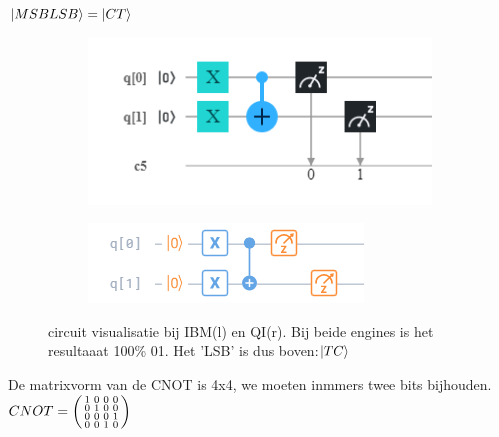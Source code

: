 \documentclass[../main.tex]{subfiles}
\begin{document}
$\ket{MSB LSB}=\ket{CT}$
\begin{figure}[h!]
\begin{subfigure}{.5\textwidth}
\leavevmode
\begin{center}
\includegraphics[width=.9\textwidth]{./img/IBMregisters.png}
\end{center}
\end{subfigure}%
\begin{subfigure}{.5\textwidth}
\leavevmode
\begin{center}
\includegraphics[width=.9\textwidth]{./img/QIregisters.png}
\end{center}
\end{subfigure}
\caption{circuit visualisatie bij IBM(l) en QI(r). Bij beide engines is het resultaaat 100\% 01.  Het 'LSB' is dus boven:$\ket{TC}$}
\label{fig:IBMQIcircuits}
\end{figure}

De matrixvorm van de CNOT is 4x4, we moeten inmmers twee bits bijhouden.
$CNOT = \smqty(1&0&0&0\\0&1&0&0\\0&0&0&1\\0&0&1&0)$
\end{document}
